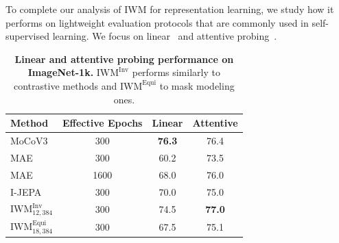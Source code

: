 \documentclass[twocolumn]{fairmeta}
\theoremstyle{plain}
\theoremstyle{definition}
\theoremstyle{remark}
\begin{document}
To complete our analysis of IWM for representation learning, we study how it performs on lightweight evaluation protocols that are commonly used in self-supervised learning. We focus on linear~\cite{chen2021mocov3} and attentive probing~\cite{chen2023context}.


\begin{table}[!t]
\centering
    \caption{\fontsize{8.5pt}{8.5pt}\selectfont
    \textbf{Linear and attentive probing performance on ImageNet-1k.} $\text{IWM}^\text{Inv}$ performs similarly to contrastive methods and  $\text{IWM}^\text{Equi}$ to mask modeling ones.}
    \label{tab:lin-att}
\begin{tabular}{lccc}
\toprule
Method & Effective Epochs & Linear & Attentive \\
\midrule
MoCoV3 & 300  & \textbf{76.3} & 76.4  \\
MAE & 300  & 60.2 & 73.5 \\
MAE & 1600  & 68.0 & 76.0 \\
I-JEPA & 300 & 70.0 & 75.0 \\
\midrule
$\text{IWM}_{12,384}^\text{Inv}$ & 300  & 74.5 & \textbf{77.0} \\
$\text{IWM}_{18,384}^\text{Equi}$ & 300 & 67.5 & 75.1 \\
\bottomrule
\end{tabular}
\vspace{-1em}
\end{table}
\end{document}
